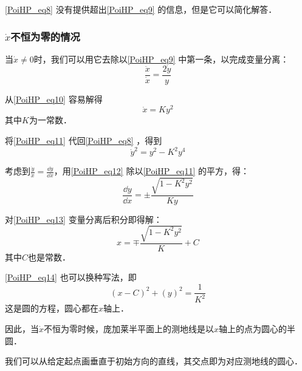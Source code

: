 \autoref{PoiHP_eq8} 没有提供超出\autoref{PoiHP_eq9} 的信息，但是它可以简化解答．

\subsubsection{$\dot{x}$不恒为零的情况}

{}%

当$\dot{x}\ne 0$时，我们可以用它去除以\autoref{PoiHP_eq9} 中第一条，以完成变量分离：
\begin{equation}\label{PoiHP_eq10}
\frac{\ddot{x}}{\dot{x}}=\frac{2\dot{y}}{y}
\end{equation}

从\autoref{PoiHP_eq10} 容易解得
\begin{equation}\label{PoiHP_eq11}
\dot{x}=Ky^2
\end{equation}
其中$K$为一常数．

将\autoref{PoiHP_eq11} 代回\autoref{PoiHP_eq8} ，得到
\begin{equation}\label{PoiHP_eq12}
\dot{y}^2=y^2-K^2y^4
\end{equation}

考虑到$\frac{\dot{y}}{\dot{x}}=\frac{\dd y}{\dd x}$，用\autoref{PoiHP_eq12} 除以\autoref{PoiHP_eq11} 的平方，得：
\begin{equation}\label{PoiHP_eq13}
\frac{\dd y}{\dd x}=\pm\frac{\sqrt{1-K^2y^2}}{Ky}
\end{equation}

对\autoref{PoiHP_eq13} 变量分离后积分即得解：
\begin{equation}\label{PoiHP_eq14}
x=\mp\frac{\sqrt{1-K^2y^2}}{K}+C
\end{equation}
其中$C$也是常数．

\autoref{PoiHP_eq14} 也可以换种写法，即
\begin{equation}
(x-C)^2+(y)^2=\frac{1}{K^2}
\end{equation}
这是圆的方程，圆心都在$x$轴上．

因此，当$\dot{x}$不恒为零时候，庞加莱半平面上的测地线是以$x$轴上的点为圆心的半圆．

我们可以从给定起点画垂直于初始方向的直线，其交点即为对应测地线的圆心．

